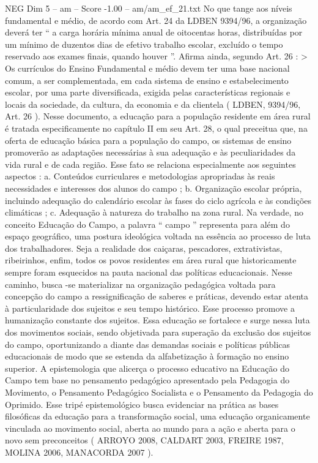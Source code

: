 \begin{textsample}{NEG Dim 5 – am – Score -1.00 – am/am\_ef\_21.txt}
No que tange aos níveis fundamental e médio, de acordo com Art. 24 da LDBEN 9394/96, a organização deverá ter “ a carga horária mínima anual de oitocentas horas, distribuídas por um mínimo de duzentos dias de efetivo trabalho escolar, excluído o tempo reservado aos exames finais, quando houver ”.
Afirma ainda, segundo Art. 26 : > Os currículos do Ensino Fundamental e médio devem ter uma base nacional comum, a ser complementada, em cada sistema de ensino e estabelecimento escolar, por uma parte diversificada, exigida pelas características regionais e locais da sociedade, da cultura, da economia e da clientela ( LDBEN, 9394/96, Art. 26 ).
Nesse documento, a educação para a população residente em área rural é tratada especificamente no capítulo II em seu Art. 28, o qual preceitua que, na oferta de educação básica para a população do campo, os sistemas de ensino promoverão as adaptações necessárias à sua adequação e às peculiaridades da vida rural e de cada região.
Esse fato se relaciona especialmente aos seguintes aspectos : a.
Conteúdos curriculares e metodologias apropriadas às reais necessidades e interesses dos alunos do campo ; b.
Organização escolar própria, incluindo adequação do calendário escolar às fases do ciclo agrícola e às condições climáticas ; c.
Adequação à natureza do trabalho na zona rural.
Na verdade, no conceito Educação do Campo, a palavra “ campo ” representa para além do espaço geográfico, uma postura ideológica voltada na essência ao processo de luta dos trabalhadores.
Seja a realidade dos caiçaras, pescadores, extrativistas, ribeirinhos, enfim, todos os povos residentes em área rural que historicamente sempre foram esquecidos na pauta nacional das políticas educacionais.
Nesse caminho, busca -se materializar na organização pedagógica voltada para concepção do campo a ressignificação de saberes e práticas, devendo estar atenta à particularidade dos sujeitos e seu tempo histórico.
Esse processo promove a humanização constante dos sujeitos.
Essa educação se fortalece e surge nessa luta dos movimentos sociais, sendo objetivada para superação da exclusão dos sujeitos do campo, oportunizando a diante das demandas sociais e políticas públicas educacionais de modo que se estenda da alfabetização à formação no ensino superior.
A epistemologia que alicerça o processo educativo na Educação do Campo tem base no pensamento pedagógico apresentado pela Pedagogia do Movimento, o Pensamento Pedagógico Socialista e o Pensamento da Pedagogia do Oprimido.
Esse tripé epistemológico busca evidenciar na prática as bases filosóficas da educação para a transformação social, uma educação organicamente vinculada ao movimento social, aberta ao mundo para a ação e aberta para o novo sem preconceitos ( ARROYO 2008, CALDART 2003, FREIRE 1987, MOLINA 2006, MANACORDA 2007 ).

\end{textsample}
